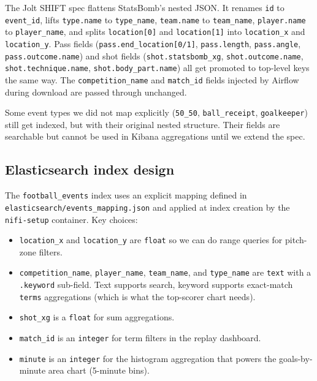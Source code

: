 \documentclass[conference]{IEEEtran}
\begin{document}
The Jolt SHIFT spec flattens StatsBomb's nested JSON. It renames
\texttt{id} to \texttt{event\_id}, lifts \texttt{type.name} to
\texttt{type\_name}, \texttt{team.name} to \texttt{team\_name},
\texttt{player.name} to \texttt{player\_name}, and splits \texttt{location[0]}
and \texttt{location[1]} into \texttt{location\_x} and \texttt{location\_y}.
Pass fields (\texttt{pass.end\_location[0/1]}, \texttt{pass.length},
\texttt{pass.angle}, \texttt{pass.outcome.name}) and shot fields
(\texttt{shot.statsbomb\_xg}, \texttt{shot.outcome.name},
\texttt{shot.technique.name}, \texttt{shot.body\_part.name}) all get promoted
to top-level keys the same way. The \texttt{competition\_name} and
\texttt{match\_id} fields injected by Airflow during download are passed
through unchanged.

Some event types we did not map explicitly (\texttt{50\_50},
\texttt{ball\_receipt}, \texttt{goalkeeper}) still get indexed, but with their
original nested structure. Their fields are searchable but cannot be used in
Kibana aggregations until we extend the spec.

\subsection{Elasticsearch index design}

The \texttt{football\_events} index uses an explicit mapping defined in
\texttt{elasticsearch/events\_mapping.json} and applied at index creation by
the \texttt{nifi-setup} container. Key choices:

\begin{itemize}
  \item \texttt{location\_x} and \texttt{location\_y} are \texttt{float} so we
        can do range queries for pitch-zone filters.
  \item \texttt{competition\_name}, \texttt{player\_name}, \texttt{team\_name},
        and \texttt{type\_name} are \texttt{text} with a \texttt{.keyword}
        sub-field. Text supports search, keyword supports exact-match
        \texttt{terms} aggregations (which is what the top-scorer chart needs).
  \item \texttt{shot\_xg} is a \texttt{float} for sum aggregations.
  \item \texttt{match\_id} is an \texttt{integer} for term filters in the
        replay dashboard.
  \item \texttt{minute} is an \texttt{integer} for the histogram aggregation
        that powers the goals-by-minute area chart (5-minute bins).
\end{itemize}
\end{document}
